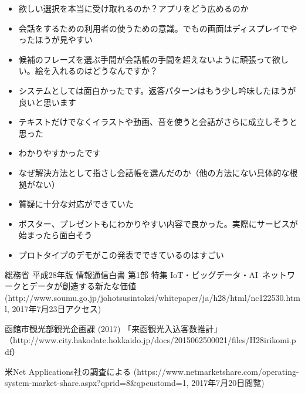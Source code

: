 \documentclass[openany,11pt,papersize]{jsbook}
\begin{document}
\begin{appendix}
\begin{itemize}
 \item 欲しい選択を本当に受け取れるのか？アプリをどう広めるのか
 \item 会話をするための利用者の使うための意識。でもの画面はディスプレイでやったほうが見やすい
 \item 候補のフレーズを選ぶ手間が会話帳の手間を超えないように頑張って欲しい。絵を入れるのはどうなんですか？
 \item システムとしては面白かったです。返答パターンはもう少し吟味したほうが良いと思います
 \item テキストだけでなくイラストや動画、音を使うと会話がさらに成立しそうと思った
 \item わかりやすかったです
 \item なぜ解決方法として指さし会話帳を選んだのか（他の方法にない具体的な根拠がない）
 \item 質疑に十分な対応ができていた
 \item ポスター、プレゼントもにわかりやすい内容で良かった。実際にサービスが始まったら面白そう
 \item プロトタイプのデモがこの発表でできているのはすごい

\end{itemize}
\end{appendix}



\begin{thebibliography}{9}
総務省 平成28年版 情報通信白書 第1部 特集 IoT・ビッグデータ・AI~ネットワークとデータが創造する新たな価値~
 (http://www.soumu.go.jp/johotsusintokei/whitepaper/ja/h28/html/nc122530.html, 2017年7月23日アクセス)

函館市観光部観光企画課 (2017) 「来函観光入込客数推計」
（http://www.city.hakodate.hokkaido.jp/docs/2015062500021/files/H28irikomi.pdf）

米Net Applications社の調査による
(https://www.netmarketshare.com/operating-system-market-share.aspx?qprid=8\&qpcustomd=1, 2017年7月20日閲覧)
\end{thebibliography}
\end{document}
